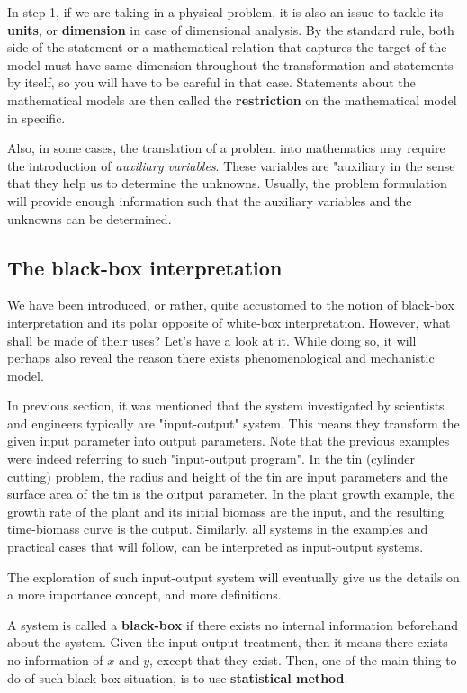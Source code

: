 In step 1, if we are taking in a physical problem, it is also an issue to tackle its \textbf{units}, or \textbf{dimension} in case of dimensional analysis. By the standard rule, both side of the statement or a mathematical relation that captures the target of the model must have same dimension throughout the transformation and statements by itself, so you will have to be careful in that case. Statements about the mathematical models are then called the \textbf{restriction} on the mathematical model in specific. 

Also, in some cases, the translation of a problem into mathematics may require the introduction of \textit{auxiliary variables}. These variables are "auxiliary in the sense that they help us to determine the unknowns. Usually, the problem formulation will provide enough information such that the auxiliary variables and the unknowns can be determined. 

\subsection{The black-box interpretation}
We have been introduced, or rather, quite accustomed to the notion of black-box interpretation and its polar opposite of white-box interpretation. However, what shall be made of their uses? Let's have a look at it. While doing so, it will perhaps also reveal the reason there exists phenomenological and mechanistic model. 

In previous section, it was mentioned that the system investigated by scientists and engineers typically are "input-output" system. This means they transform the given input parameter into output parameters. Note that the previous examples were indeed referring to such "input-output program". In the tin (cylinder cutting) problem, the radius and height of the tin are input parameters and the surface area of the tin is the output parameter. In the plant growth example, the growth rate of the plant and its initial biomass are the input, and the resulting time-biomass curve is the output. Similarly, all systems in the examples and practical cases that will follow, can be interpreted as input-output systems. 

The exploration of such input-output system will eventually give us the details on a more importance concept, and more definitions. 

A system is called a \textbf{black-box} if there exists no internal information beforehand about the system. Given the input-output treatment, then it means there exists no information of $x$ and $y$, except that they exist. Then, one of the main thing to do of such black-box situation, is to use \textbf{statistical method}. 


